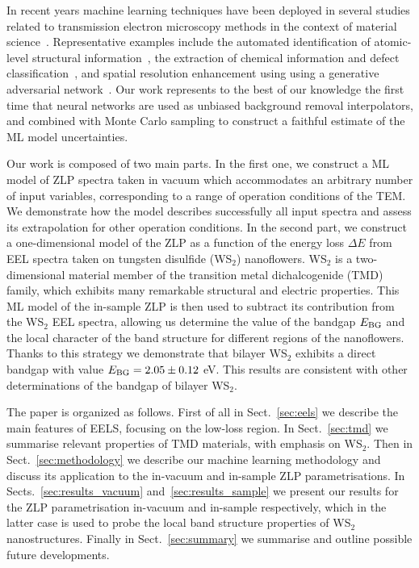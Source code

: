 In recent years
machine learning techniques have been deployed in several studies
related to transmission electron microscopy methods
in the context of material science~\cite{Gordon:2020, Zhang:2019, Jany:2017, Ziatdinov:2017}.
%
Representative examples
include the automated identification
of atomic-level structural information~\cite{10.1145/2834892.2834896},
the extraction of chemical information
and defect classification~\cite{doi:10.1021/acsnano.7b07504},
and spatial resolution enhancement
using  using a generative adversarial network~\cite{cite-key}.
%
Our work represents to the best of our knowledge
the first time that neural networks are used as 
 unbiased
background removal interpolators, and combined with Monte Carlo sampling to construct a faithful estimate
of the ML model uncertainties.

Our work is composed of two main parts.
%
In the first one, we construct a ML model of ZLP spectra taken
in vacuum which accommodates an  arbitrary number of input
variables, corresponding to a range of operation conditions of the TEM.
%
We demonstrate how the model describes successfully all
input spectra and assess its extrapolation for other operation
conditions.
%
In the second part, we construct a one-dimensional model
of the ZLP as a function of the energy loss $\Delta E$ from EEL spectra taken on
tungsten disulfide (WS$_2$) nanoflowers.
%
WS$_2$ is a two-dimensional material member of the transition metal dichalcogenide (TMD) family,
which exhibits many remarkable structural and electric properties.
%
This ML model of the in-sample ZLP is then used to subtract its contribution
from the WS$_2$ EEL spectra, allowing us determine the value of the bandgap $E_{\rm BG}$
and the local character of the band structure for different regions of the nanoflowers.
%
Thanks to this strategy  we demonstrate that bilayer WS$_2$ exhibits a direct bandgap
with value $E_{\rm BG}= 2.05 \pm 0.12$ eV.
%
This results are consistent with other determinations of the bandgap of bilayer WS$_2$.

The paper is organized as follows.
%
First of all in Sect.~\ref{sec:eels}
we describe the main features of EELS, focusing on the low-loss region.
%
In Sect.~\ref{sec:tmd} we summarise relevant properties of TMD materials,
with emphasis on WS$_2$.
%
Then in Sect.~\ref{sec:methodology} we describe our machine learning methodology
and discuss its application to the in-vacuum and in-sample
ZLP parametrisations.
%
In Sects.~\ref{sec:results_vacuum} and~\ref{sec:results_sample}
we present our results for the ZLP parametrisation
in-vacuum and in-sample respectively, which in the latter
case is used to probe the local band structure properties
of WS$_2$ nanostructures.
%
Finally in Sect.~\ref{sec:summary} we summarise
and outline possible future developments.

